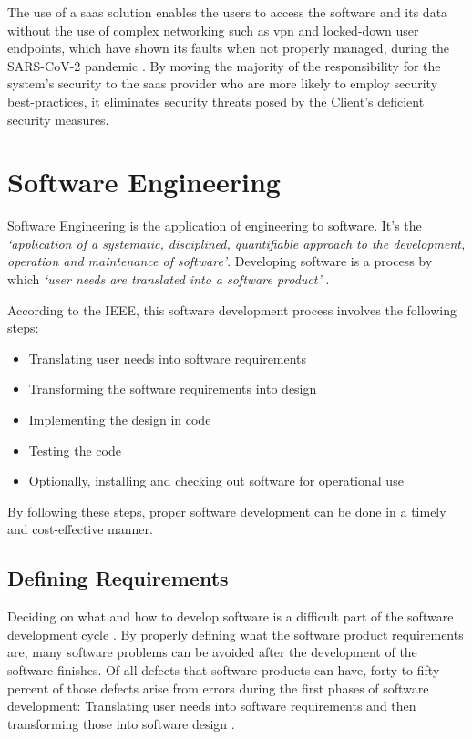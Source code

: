 The use of a \gls{saas} solution enables the users to access the software and its data without the use of complex networking such as \gls{vpn} and locked-down user endpoints, which have shown its faults when not properly managed, during the SARS-CoV-2 pandemic \Parencite{adams_al_shahery_chmiel_cunliffe_day_fay_gardner_giuliani_goddard_karl_2022}. By moving the majority of the responsibility for the system's security to the \gls{saas} provider who are more likely to employ security best-practices, it eliminates security threats posed by the Client's deficient security measures.




\section{Software Engineering}\label{state-of-the-art:s:software-engineering}

Software Engineering is the application of engineering to software. It's the \textit{`application of a systematic, disciplined, quantifiable approach to the development, operation and maintenance of software'}. Developing software is a process by which \textit{`user needs are translated into a software product'} \parencite{8016712}.

According to the IEEE, this software development process involves the following steps:

\begin{itemize}

    \item Translating user needs into software requirements
    \item Transforming the software requirements into design
    \item Implementing the design in code
    \item Testing the code
    \item Optionally, installing and checking out software for operational use   
\end{itemize}

By following these steps, proper software development can be done in a timely and cost-effective manner.

\subsection{Defining Requirements}\label{state-of-the-art:ss:defining-requirements}

Deciding on what and how to develop software is a difficult part of the software development cycle \parencite{pacheco_garcía_reyes_2018}.
By properly defining what the software product requirements are, many software problems can be avoided after the development of the software finishes. Of all defects that software products can have, forty to fifty percent of those defects arise from errors during the first phases of software development: Translating user needs into software requirements and then transforming those into software design \Parencite{eugene_wiegers_beatty_2013}. 

